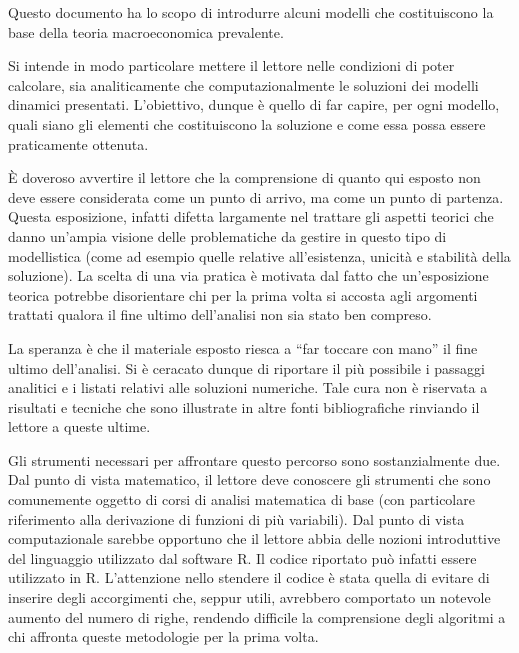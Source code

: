 
Questo documento ha lo scopo di introdurre alcuni modelli che costituiscono la base della teoria macroeconomica prevalente. 

Si intende in modo particolare mettere il lettore nelle condizioni di poter calcolare, sia analiticamente che computazionalmente le soluzioni dei modelli dinamici presentati. L'obiettivo, dunque \`e quello di far capire, per ogni modello, quali siano gli elementi che costituiscono la soluzione e come essa possa essere praticamente ottenuta.

\`E doveroso avvertire il lettore che la comprensione di quanto qui esposto non deve essere considerata come un punto di arrivo, ma come un punto di partenza. Questa esposizione, infatti difetta largamente nel trattare gli aspetti teorici che danno un'ampia visione delle problematiche da gestire in questo tipo di modellistica (come ad esempio quelle relative all'esistenza, unicit\`a e stabilit\`a della soluzione). La scelta di una via pratica \`e motivata dal fatto che un'esposizione teorica potrebbe disorientare chi per la prima volta si accosta agli argomenti trattati qualora il fine ultimo dell'analisi non sia stato ben compreso.

La speranza \`e che il materiale esposto riesca a ``far toccare con mano'' il fine ultimo dell'analisi. 
Si \`e ceracato dunque di riportare il pi\`u possibile i passaggi analitici e i listati relativi alle soluzioni numeriche. Tale cura non \`e riservata a risultati e tecniche che sono illustrate in altre fonti bibliografiche rinviando il lettore a queste ultime. 

Gli strumenti necessari per affrontare questo percorso sono sostanzialmente due. Dal punto di vista matematico, il lettore deve conoscere gli strumenti che sono comunemente oggetto di corsi di analisi matematica di base (con particolare riferimento alla derivazione di funzioni di pi\`u variabili). Dal punto di vista computazionale sarebbe opportuno che il lettore abbia delle nozioni introduttive del linguaggio utilizzato dal software R. Il codice riportato pu\`o infatti essere utilizzato in R.
L'attenzione nello stendere il codice \`e stata quella di evitare di inserire degli accorgimenti che, seppur utili, avrebbero comportato un notevole aumento del numero di righe, rendendo difficile la comprensione degli algoritmi a chi affronta queste metodologie per la prima volta.

